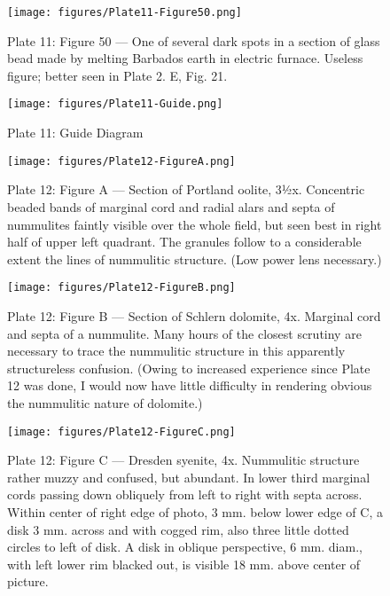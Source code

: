 \documentclass[a4paper, 12pt, oneside]{article}
\begin{document}
\clearpage
\begin{figure}[b]
\centering
\texttt{[image: figures/Plate11-Figure50.png]}
\caption{\small Plate 11: Figure 50 --- One of several dark spots in a section of glass bead made by melting Barbados earth in electric furnace. Useless figure; better seen in Plate 2. E, Fig. 21.}
\end{figure}
\clearpage
\begin{figure}[b]
\centering
\texttt{[image: figures/Plate11-Guide.png]}
\caption{\small Plate 11: Guide Diagram}
\end{figure}
\clearpage
{}
\cfoot{\thepage}
\begin{figure}[b]
\centering
\texttt{[image: figures/Plate12-FigureA.png]}
\caption{\small Plate 12: Figure A --- Section of Portland oolite, 3½x. Concentric beaded bands of marginal cord and radial alars and septa of nummulites faintly visible over the whole field, but seen best in right half of upper left quadrant. The granules follow to a considerable extent the lines of nummulitic structure. (Low power lens necessary.)}
\end{figure}
\clearpage
\begin{figure}[b]
\centering
\texttt{[image: figures/Plate12-FigureB.png]}
\caption{\small Plate 12: Figure B --- Section of Schlern dolomite, 4x. Marginal cord and septa of a nummulite. Many hours of the closest scrutiny are necessary to trace the nummulitic structure in this apparently structureless confusion. (Owing to increased experience since Plate 12 was done, I would now have little difficulty in rendering obvious the nummulitic nature of dolomite.)}
\end{figure}
\clearpage
\begin{figure}[b]
\centering
\texttt{[image: figures/Plate12-FigureC.png]}
\caption{\small Plate 12: Figure C --- Dresden syenite, 4x. Nummulitic structure rather muzzy and confused, but abundant. In lower third marginal cords passing down obliquely from left to right with septa across. Within center of right edge of photo, 3 mm. below lower edge of C, a disk 3 mm. across and with cogged rim, also three little dotted circles to left of disk. A disk in oblique perspective, 6 mm. diam., with left lower rim blacked out, is visible 18 mm. above center of picture.}
\end{figure}
\end{document}

